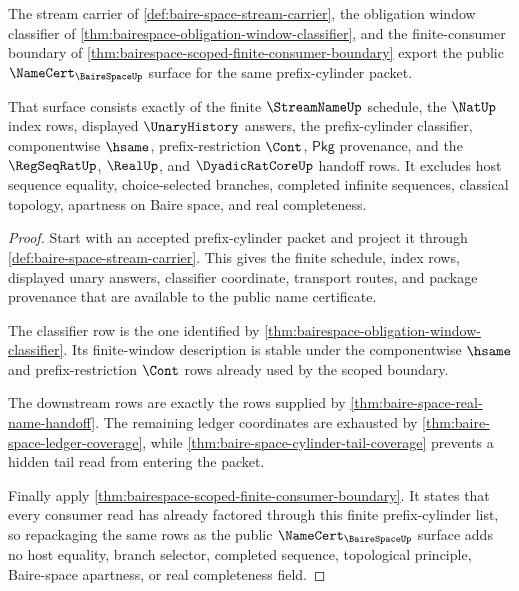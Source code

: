 \begin{theorem}
\label{thm:bairespace-public-prefix-cylinder-certificate}
The stream carrier of \autoref{def:baire-space-stream-carrier}, the obligation
window classifier of \autoref{thm:bairespace-obligation-window-classifier}, and
the finite-consumer boundary of
\autoref{thm:bairespace-scoped-finite-consumer-boundary} export the public
$\NameCert_{\BaireSpaceUp}$ surface for the same prefix-cylinder packet.

That surface consists exactly of the finite $\StreamNameUp$ schedule, the
$\NatUp$ index rows, displayed $\UnaryHistory$ answers, the prefix-cylinder
classifier, componentwise $\hsame$, prefix-restriction $\Cont$,
$\mathsf{Pkg}$ provenance, and the $\RegSeqRatUp$, $\RealUp$, and
$\DyadicRatCoreUp$ handoff rows. It excludes host sequence equality,
choice-selected branches, completed infinite sequences, classical topology,
apartness on Baire space, and real completeness.
\end{theorem}
\begin{proof}
Start with an accepted prefix-cylinder packet and project it through
\autoref{def:baire-space-stream-carrier}. This gives the finite schedule,
index rows, displayed unary answers, classifier coordinate, transport routes,
and package provenance that are available to the public name certificate.

The classifier row is the one identified by
\autoref{thm:bairespace-obligation-window-classifier}. Its finite-window
description is stable under the componentwise $\hsame$ and prefix-restriction
$\Cont$ rows already used by the scoped boundary.

The downstream rows are exactly the rows supplied by
\autoref{thm:baire-space-real-name-handoff}. The remaining ledger coordinates
are exhausted by \autoref{thm:baire-space-ledger-coverage}, while
\autoref{thm:baire-space-cylinder-tail-coverage} prevents a hidden tail read
from entering the packet.

Finally apply \autoref{thm:bairespace-scoped-finite-consumer-boundary}. It
states that every consumer read has already factored through this finite
prefix-cylinder list, so repackaging the same rows as the public
$\NameCert_{\BaireSpaceUp}$ surface adds no host equality, branch selector,
completed sequence, topological principle, Baire-space apartness, or real
completeness field.
\end{proof}


